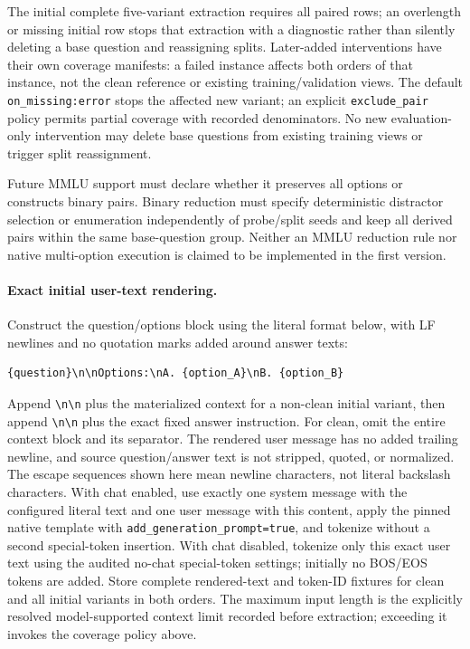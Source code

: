 \documentclass[11pt]{article}
\begin{document}
\begin{enumerate}
The initial complete five-variant extraction requires all paired rows; an overlength or missing initial row stops that extraction with a diagnostic rather than silently deleting a base question and reassigning splits.
Later-added interventions have their own coverage manifests: a failed instance affects both orders of that instance, not the clean reference or existing training/validation views.
The default \texttt{on\_missing:error} stops the affected new variant; an explicit \texttt{exclude\_pair} policy permits partial coverage with recorded denominators.
No new evaluation-only intervention may delete base questions from existing training views or trigger split reassignment.
\end{enumerate}
Future MMLU support must declare whether it preserves all options or constructs binary pairs.
Binary reduction must specify deterministic distractor selection or enumeration independently of probe/split seeds and keep all derived pairs within the same base-question group.
Neither an MMLU reduction rule nor native multi-option execution is claimed to be implemented in the first version.

\paragraph{Exact initial user-text rendering.}
Construct the question/options block using the literal format below, with LF newlines and no quotation marks added around answer texts:
\begin{verbatim}
{question}\n\nOptions:\nA. {option_A}\nB. {option_B}
\end{verbatim}
Append \texttt{\textbackslash n\textbackslash n} plus the materialized context for a non-clean initial variant, then append \texttt{\textbackslash n\textbackslash n} plus the exact fixed answer instruction.
For clean, omit the entire context block and its separator.
The rendered user message has no added trailing newline, and source question/answer text is not stripped, quoted, or normalized.
The escape sequences shown here mean newline characters, not literal backslash characters.
With chat enabled, use exactly one system message with the configured literal text and one user message with this content, apply the pinned native template with \texttt{add\_generation\_prompt=true}, and tokenize without a second special-token insertion.
With chat disabled, tokenize only this exact user text using the audited no-chat special-token settings; initially no BOS/EOS tokens are added.
Store complete rendered-text and token-ID fixtures for clean and all initial variants in both orders.
The maximum input length is the explicitly resolved model-supported context limit recorded before extraction; exceeding it invokes the coverage policy above.
\end{document}
